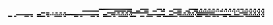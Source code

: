 \documentclass[10pt]{article}
\theoremstyle{plain}
\theoremstyle{definition}
\begin{document}
\begin{table*}[b]
{\begin{minipage}{5.32in}
\[\begin{array}{@{}r@{}}
\begin{array}{@{}l@{}}
\end{array}
\mynnl
\begin{array}{@{}l@{}}
\a\a\a\a\a\a\a\a\a\a\a\a\a\a\a\a\a\a\a\a\a\a\a\a\a\a\a\a\a\a\a\a\a\a\a\a \a\a\a\a\a\a\a\a\a\a\a\a\a\a\a\a\a\a\a\a\a\a\a\a\a\a\a\a\a\a\a\a\a\a\a\a \a\a\a\a\a\a\a\a\a\a\a\a\a\a\a\a\a\a\a\a\a\a\a\a\b\b\b\b\b\b\b\b\b\b\b\b \b\b\b\b\b\b\b\b\b\b\b\b\b\b\b\b\b\b\b\b\a\a\a\a\a\a\a\a\b\b\b\b\b\b\b\b \a\a\a\a\a\a\a\a\b\b\b\b\b\a\b\b\a\a\a\a\a\a\a\a\b\b\b\b\b\b\b\b\a\a\a\a \a\a\a\b\b\b\b\b\b\b\b\b\a\a\b\b\a\a\b\b\a\a\b\b\a\a\b\b\a\a\b\b\a\a\a\b \a\a\b\b\a\a\b\b\a\a\b\b\a\a\b\b\a\b\b\b\a\a\b\b\a\a\b\b\a\a\b\b\a\a\b\b \a\a\b\b\mynl
\a\a\a\a\a\a\a\a\a\a\a\a\a\a\a\a\a\a\a\a\a\a\a\a\a\a\a\a\a\a\a\a\a\a\a\a \a\a\a\a\a\a\a\a\a\a\a\a\a\a\a\a\a\a\a\a\a\a\a\a\a\a\a\a\a\a\a\a\a\a\a\a \a\a\a\a\a\a\a\a\b\b\b\b\b\b\b\b\b\b\b\b\b\b\b\b\a\a\a\a\a\a\a\a\a\a\a\a \a\a\a\b\b\b\b\b\b\b\b\b\b\b\a\b\b\b\b\b\a\a\a\a\b\b\b\b\a\a\a\a\b\b\b\b \a\a\a\a\b\b\b\b\a\a\a\a\b\b\b\b\a\a\a\a\b\b\b\b\a\a\a\a\b\b\b\b\a\a\a\a \b\b\b\b\a\a\a\a\b\b\b\b\a\b\a\b\a\b\a\b\a\b\a\b\a\b\a\b\a\b\a\b\a\b\b\b \a\b\a\b\a\b\a\b\a\b\a\b\a\b\a\b\a\a\a\b\a\b\a\b\a\b\a\b\a\b\a\b\a\b\a\b \a\b\a\b\mynl
\a\a\a\a\a\a\a\a\a\a\a\a\a\a\a\a\a\a\a\a\a\a\a\a\a\a\a\a\a\a\a\a\a\a\a\a \a\a\a\a\b\b\b\b\a\b\b\b\a\a\a\b\a\a\b\b\a\a\b\b\a\a\b\b\a\a\a\a\a\a\a\a \a\a\a\a\a\a\a\a\a\a\a\a\a\a\a\a\a\a\a\a\a\a\a\a\a\a\a\a\a\a\a\a\b\b\b\b \b\b\b\b\a\a\b\b\a\a\b\b\a\a\b\b\a\a\b\b\b\b\b\b\b\b\b\b\b\b\b\b\b\b\b\b \a\a\a\a\a\a\a\a\a\a\a\a\a\a\a\a\a\a\a\a\a\a\a\a\b\b\b\b\b\b\b\b\a\a\b\b \a\a\b\b\b\a\b\b\a\a\b\b\b\b\b\b\b\b\b\b\b\b\b\b\b\b\b\b\a\a\a\a\a\a\a\a \a\a\a\a\a\a\a\a\a\a\a\b\a\a\a\a\b\b\b\b\b\b\b\b\a\a\b\b\a\a\b\b\a\a\b\b \a\a\b\b\mynl
\a\a\a\a\a\a\a\a\a\a\a\a\a\a\a\a\b\b\b\b\b\b\b\b\b\b\b\b\b\b\b\b\a\a\a\a \b\b\b\b\a\a\a\a\a\b\b\b\a\b\a\b\a\b\a\b\a\b\a\b\a\b\a\b\b\b\b\b\b\b\b\b \b\b\b\b\b\b\b\b\b\b\b\b\b\b\b\b\b\b\b\b\b\b\b\b\a\a\a\a\b\b\b\b\a\a\a\a \b\b\b\b\a\b\a\b\a\b\a\b\a\b\a\b\a\b\a\b\a\a\a\a\a\a\a\a\a\a\a\a\a\a\a\b \b\b\b\b\b\b\b\b\b\b\b\b\b\b\b\b\a\a\a\a\b\b\b\b\a\a\a\a\b\b\b\b\a\b\a\b \a\b\a\b\a\b\a\b\a\b\a\b\b\b\b\b\b\b\b\b\b\b\a\b\b\b\b\b\b\b\b\b\b\b\b\b \b\b\b\b\b\b\b\b\a\a\a\b\b\b\b\b\a\a\a\a\b\b\b\b\a\b\a\b\a\b\a\b\a\b\a\b \a\b\a\b\mynl
\a\a\a\a\a\a\a\a\b\b\b\b\a\a\b\b\a\a\a\a\a\a\a\a\b\b\b\b\a\a\b\b\a\a\a\a \b\b\b\b\b\b\b\b\a\a\b\b\a\a\a\a\a\b\b\b\b\b\b\b\a\a\b\b\a\a\a\a\a\a\a\a \b\b\b\b\a\a\b\b\a\a\a\a\a\a\a\a\b\b\b\b\a\a\b\b\a\a\a\a\b\b\b\b\b\b\b\b \a\a\b\b\a\a\a\b\b\b\b\b\b\b\b\b\a\a\b\b\b\b\b\b\a\a\a\a\b\b\b\b\a\a\b\b \b\b\b\b\a\a\a\a\b\b\b\b\a\a\b\b\b\b\b\b\b\b\b\b\b\b\b\b\a\a\b\b\b\b\b\b \b\b\b\b\b\b\b\b\a\a\b\b\b\b\b\b\a\a\a\b\b\b\b\b\a\a\b\b\b\a\b\b\a\a\a\a \b\b\b\b\a\a\b\b\b\b\b\b\b\b\b\b\b\b\b\b\a\a\b\b\b\b\b\b\b\b\b\b\b\b\b\b \a\a\b\b\mynl

\end{array}
\end{array}\]
\end{minipage}}
\end{table*}
\end{document}
